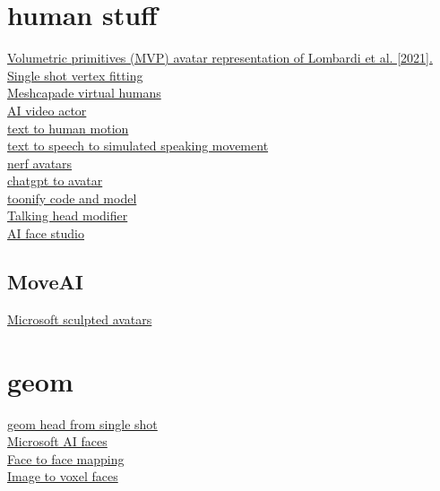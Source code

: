 {\section{human stuff}
\href{https://dl.acm.org/doi/abs/10.1145/3528233.3530740}{Volumetric primitives (MVP) avatar representation of Lombardi et al. [2021].}\\
\href{https://arxiv.org/abs/2205.06254}{Single shot vertex fitting}\\
\href{https://meshcapade.com/}{Meshcapade virtual humans}\\
\href{https://share.synthesia.io/a5a12c73-09cb-4455-b007-147ae4b1effb}{AI video actor}\\
\href{https://ofa-sys.github.io/MoFusion/}{text to human motion}\\
\href{https://talkshow.is.tue.mpg.de/}{text to speech to simulated speaking movement}\\
\href{https://www.linkedin.com/posts/reneschulte_nerf-deeplearning-metaverse-activity-7010898662465617921-56P_?utm_source=share&utm_medium=member_desktop}{nerf avatars}\\
\href{https://twitter.com/IntuitMachine/status/1608690077139599360}{chatgpt to avatar}\\
\href{https://www.mmlab-ntu.com/project/vtoonify/}{toonify code and model}\\
\href{https://github.com/Meta-Portrait/MetaPortrait}{Talking head modifier}\\
\href{https://www.d-id.com/}{AI face studio}\\
\subsection{MoveAI}
\href{https://3d-avatar-diffusion.microsoft.com/?utm_campaign=AI%20Art%20Weekly&utm_medium=email&utm_source=Revue%20newsletter#/}{Microsoft sculpted avatars}\\
\section{geom}
\href{https://samsunglabs.github.io/rome/}{geom head from single shot}\\
\href{https://www.youtube.com/watch?v=uboj01Gfy1A}{Microsoft AI faces}\\
\href{https://replicate.com/yoyo-nb/thin-plate-spline-motion-model}{Face to face mapping}\\
\href{https://katjaschwarz.github.io/voxgraf/}{Image to voxel faces}\\
}
